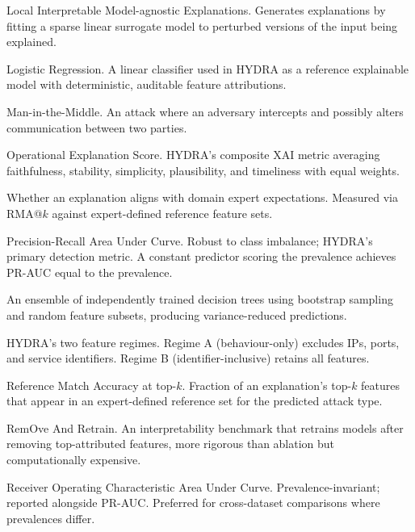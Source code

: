 \documentclass[12pt,a4paper]{report}
\begin{document}
\begin{description}[leftmargin=2.8cm,style=nextline,itemsep=0.2em]
\item[LIME] Local Interpretable Model-agnostic Explanations. Generates explanations by fitting a sparse linear surrogate model to perturbed versions of the input being explained.

\item[LogReg] Logistic Regression. A linear classifier used in HYDRA as a reference explainable model with deterministic, auditable feature attributions.

\item[MitM] Man-in-the-Middle. An attack where an adversary intercepts and possibly alters communication between two parties.

\item[OXS] Operational Explanation Score. HYDRA's composite XAI metric averaging faithfulness, stability, simplicity, plausibility, and timeliness with equal weights.

\item[Plausibility] Whether an explanation aligns with domain expert expectations. Measured via RMA@$k$ against expert-defined reference feature sets.

\item[PR-AUC] Precision-Recall Area Under Curve. Robust to class imbalance; HYDRA's primary detection metric. A constant predictor scoring the prevalence achieves PR-AUC equal to the prevalence.

\item[Random Forest] An ensemble of independently trained decision trees using bootstrap sampling and random feature subsets, producing variance-reduced predictions.

\item[Regime A / Regime B] HYDRA's two feature regimes. Regime A (behaviour-only) excludes IPs, ports, and service identifiers. Regime B (identifier-inclusive) retains all features.

\item[RMA@$k$] Reference Match Accuracy at top-$k$. Fraction of an explanation's top-$k$ features that appear in an expert-defined reference set for the predicted attack type.

\item[ROAR] RemOve And Retrain. An interpretability benchmark that retrains models after removing top-attributed features, more rigorous than ablation but computationally expensive.

\item[ROC-AUC] Receiver Operating Characteristic Area Under Curve. Prevalence-invariant; reported alongside PR-AUC. Preferred for cross-dataset comparisons where prevalences differ.


\end{description}
\end{document}
